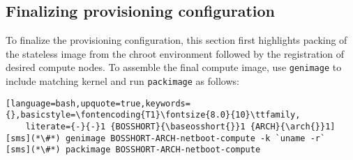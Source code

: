 \subsection{Finalizing provisioning configuration} \label{sec:assemble_bootstrap}

To finalize the \xCAT{} provisioning configuration, this section first highlights
packing of the stateless image from the chroot environment followed by the
registration of desired compute nodes. To assemble the final compute image, use
\texttt{genimage} to include matching kernel and run
\texttt{packimage} as follows:

\begin{lstlisting}[language=bash,upquote=true,keywords={},basicstyle=\fontencoding{T1}\fontsize{8.0}{10}\ttfamily,
    literate={-}{-}1 {BOSSHORT}{\baseosshort{}}1 {ARCH}{\arch{}}1]
[sms](*\#*) genimage BOSSHORT-ARCH-netboot-compute -k `uname -r`
[sms](*\#*) packimage BOSSHORT-ARCH-netboot-compute
\end{lstlisting}

